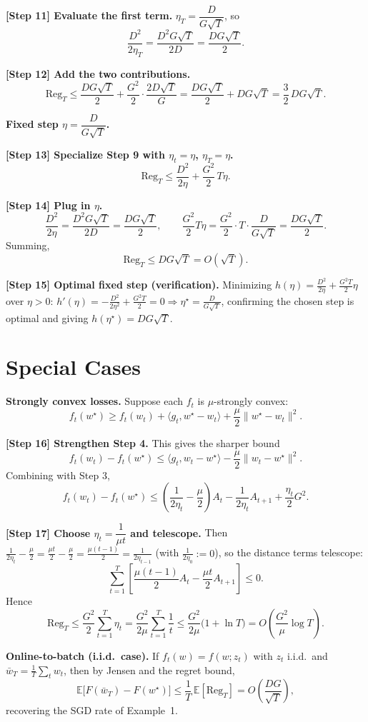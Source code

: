 \documentclass[11pt]{article}
\begin{document}
\textbf{[Step 11] Evaluate the first term.}
$\eta_T = \dfrac{D}{G\sqrt{T}}$, so
\[
\frac{D^2}{2\eta_T} = \frac{D^2 G\sqrt{T}}{2D} = \frac{D G\sqrt{T}}{2}.
\]

\textbf{[Step 12] Add the two contributions.}
\[
\mathrm{Reg}_T
\le \frac{DG\sqrt{T}}{2} + \frac{G^2}{2}\cdot\frac{2D\sqrt{T}}{G}
= \frac{DG\sqrt{T}}{2} + D G\sqrt{T}
= \frac{3}{2}\,D G\sqrt{T}.
\]

\textbf{Fixed step $\eta = \dfrac{D}{G\sqrt{T}}$.}

\textbf{[Step 13] Specialize Step 9 with $\eta_t=\eta$, $\eta_T=\eta$.}
\[
\mathrm{Reg}_T
\le \frac{D^2}{2\eta} + \frac{G^2}{2}\,T\eta.
\]

\textbf{[Step 14] Plug in $\eta$.}
\[
\frac{D^2}{2\eta} = \frac{D^2 G\sqrt{T}}{2D} = \frac{DG\sqrt{T}}{2},
\qquad
\frac{G^2}{2}T\eta = \frac{G^2}{2}\cdot T\cdot\frac{D}{G\sqrt{T}}
= \frac{DG\sqrt{T}}{2}.
\]
Summing,
\[
\mathrm{Reg}_T \le DG\sqrt{T} = O(\sqrt{T}).
\]

\textbf{[Step 15] Optimal fixed step (verification).}
Minimizing $h(\eta)=\frac{D^2}{2\eta}+\frac{G^2 T}{2}\eta$ over $\eta>0$:
$h'(\eta) = -\frac{D^2}{2\eta^2}+\frac{G^2 T}{2}=0 \Rightarrow \eta^\star=\frac{D}{G\sqrt{T}}$,
confirming the chosen step is optimal and giving $h(\eta^\star)=DG\sqrt{T}$.

\section*{Special Cases}

\textbf{Strongly convex losses.}
Suppose each $f_t$ is $\mu$-strongly convex:
\[
f_t(w^\star) \ge f_t(w_t) + \langle g_t, w^\star - w_t\rangle + \frac{\mu}{2}\|w^\star-w_t\|^2.
\]

\textbf{[Step 16] Strengthen Step 4.}
This gives the sharper bound
\[
f_t(w_t) - f_t(w^\star)
\le \langle g_t, w_t - w^\star\rangle - \frac{\mu}{2}\|w_t - w^\star\|^2.
\]
Combining with Step 3,
\[
f_t(w_t)-f_t(w^\star)
\le \left(\frac{1}{2\eta_t}-\frac{\mu}{2}\right)A_t
 - \frac{1}{2\eta_t}A_{t+1} + \frac{\eta_t}{2}G^2.
\]

\textbf{[Step 17] Choose $\eta_t = \dfrac{1}{\mu t}$ and telescope.}
Then $\frac{1}{2\eta_t}-\frac{\mu}{2} = \frac{\mu t}{2}-\frac{\mu}{2} = \frac{\mu(t-1)}{2}
= \frac{1}{2\eta_{t-1}}$ (with $\frac{1}{2\eta_0}:=0$), so the distance terms telescope:
\[
\sum_{t=1}^{T}\left[\frac{\mu(t-1)}{2}A_t - \frac{\mu t}{2}A_{t+1}\right] \le 0.
\]
Hence
\[
\mathrm{Reg}_T \le \frac{G^2}{2}\sum_{t=1}^{T}\eta_t
= \frac{G^2}{2\mu}\sum_{t=1}^{T}\frac{1}{t}
\le \frac{G^2}{2\mu}\bigl(1+\ln T\bigr) = O\!\left(\frac{G^2}{\mu}\log T\right).
\]

\textbf{Online-to-batch (i.i.d.\ case).}
If $f_t(w)=f(w;z_t)$ with $z_t$ i.i.d.\ and $\bar w_T=\frac1T\sum_t w_t$, then by Jensen
and the regret bound,
\[
\mathbb{E}\bigl[F(\bar w_T) - F(w^\star)\bigr]
\le \frac{1}{T}\,\mathbb{E}[\mathrm{Reg}_T]
= O\!\left(\frac{DG}{\sqrt{T}}\right),
\]
recovering the SGD rate of Example~1.
\end{document}
